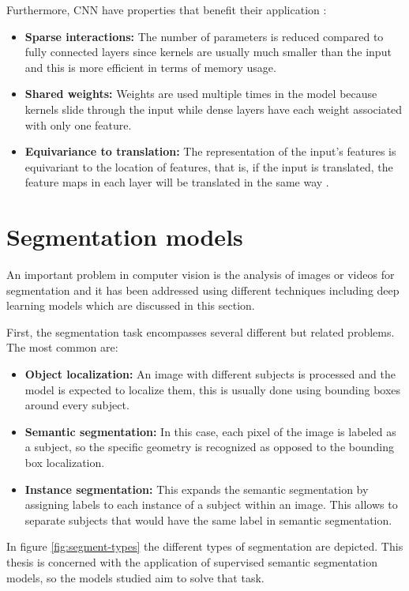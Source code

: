 Furthermore, CNN have properties that benefit their application \cite{cnn-survey}:
\begin{itemize}
    \item \textbf{Sparse interactions:} The number of parameters is reduced compared to fully connected layers since kernels are usually much smaller than the input and this is more efficient in terms of memory usage.
    \item \textbf{Shared weights:} Weights are used multiple times in the model because kernels slide through the input while dense layers have each weight associated with only one feature.
    \item \textbf{Equivariance to translation:} The representation of the input's features is equivariant to the location of features, that is, if the input is translated, the feature maps in each layer will be translated in the same way \cite{dl-book}.
\end{itemize}

\section{Segmentation models}
An important problem in computer vision is the analysis of images or videos for segmentation and it has been addressed using different techniques including deep learning models which are discussed in this section.

First, the segmentation task encompasses several different but related problems. The most common are: 
\begin{itemize}
    \item \textbf{Object localization:} An image with different subjects is processed and the model is expected to localize them, this is usually done using bounding boxes around every subject.
    
    \item \textbf{Semantic segmentation:} In this case, each pixel of the image is labeled as a subject, so the specific geometry is recognized as opposed to the bounding box localization.
    
    \item \textbf{Instance segmentation:} This expands the semantic segmentation by assigning labels to each instance of a subject within an image. This allows to separate subjects that would have the same label in semantic segmentation.
\end{itemize}

In figure \ref{fig:segment-types} the different types of segmentation are depicted. This thesis is concerned with the application of supervised semantic segmentation models, so the models studied aim to solve that task.

